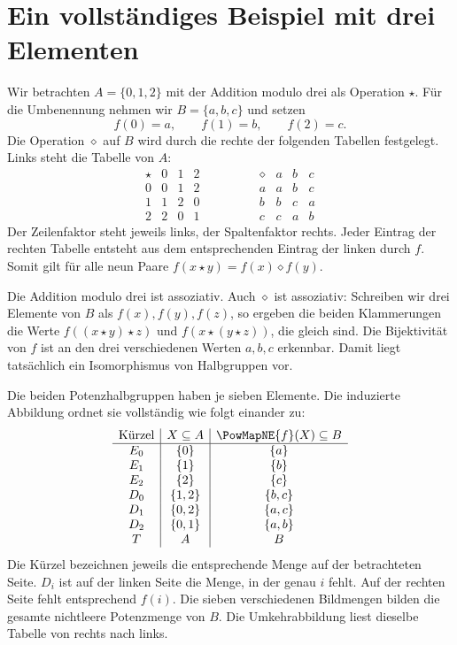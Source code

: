 \clearpage
\section*{Ein vollständiges Beispiel mit drei Elementen}

Wir betrachten \(A=\{0,1,2\}\) mit der Addition modulo drei als
Operation \(\star\). Für die Umbenennung nehmen wir
\(B=\{a,b,c\}\) und setzen
\[
  f(0)=a,\qquad f(1)=b,\qquad f(2)=c.
\]
Die Operation \(\diamond\) auf \(B\) wird durch die rechte der
folgenden Tabellen festgelegt. Links steht die Tabelle von \(A\):
\[
  \begin{array}{c|ccc}
    \star&0&1&2\\\hline
    0&0&1&2\\
    1&1&2&0\\
    2&2&0&1
  \end{array}
  \qquad\qquad
  \begin{array}{c|ccc}
    \diamond&a&b&c\\\hline
    a&a&b&c\\
    b&b&c&a\\
    c&c&a&b
  \end{array}
\]
Der Zeilenfaktor steht jeweils links, der Spaltenfaktor rechts.
Jeder Eintrag der rechten Tabelle entsteht aus dem entsprechenden
Eintrag der linken durch \(f\). Somit gilt für alle neun Paare
\(f(x\star y)=f(x)\diamond f(y)\).

Die Addition modulo drei ist assoziativ. Auch \(\diamond\) ist
assoziativ: Schreiben wir drei Elemente von \(B\) als \(f(x),f(y),f(z)\),
so ergeben die beiden Klammerungen die Werte
\(f((x\star y)\star z)\) und \(f(x\star(y\star z))\), die gleich sind.
Die Bijektivität von \(f\) ist an den drei verschiedenen Werten
\(a,b,c\) erkennbar. Damit liegt tatsächlich ein Isomorphismus von
Halbgruppen vor.

Die beiden Potenzhalbgruppen haben je sieben Elemente. Die induzierte
Abbildung ordnet sie vollständig wie folgt einander zu:
\[
  \begin{array}{c|c|c}
    \text{Kürzel}&X\subseteq A&\PowMapNE{f}(X)\subseteq B\\\hline
    E_0&\{0\}&\{a\}\\
    E_1&\{1\}&\{b\}\\
    E_2&\{2\}&\{c\}\\
    D_0&\{1,2\}&\{b,c\}\\
    D_1&\{0,2\}&\{a,c\}\\
    D_2&\{0,1\}&\{a,b\}\\
    T&A&B
  \end{array}
\]
Die Kürzel bezeichnen jeweils die entsprechende Menge auf der
betrachteten Seite. \(D_i\) ist auf der linken Seite die Menge,
in der genau \(i\) fehlt. Auf der rechten Seite fehlt entsprechend
\(f(i)\). Die sieben verschiedenen Bildmengen bilden die gesamte
nichtleere Potenzmenge von \(B\). Die Umkehrabbildung liest dieselbe
Tabelle von rechts nach links.

